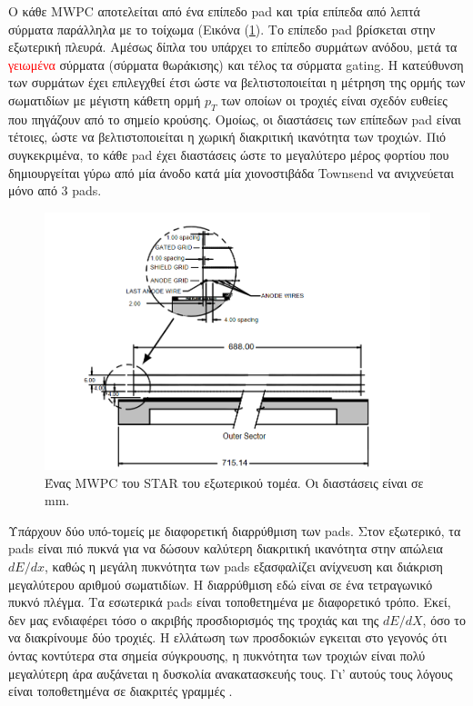	Ο κάθε MWPC αποτελείται από ένα επίπεδο pad και τρία επίπεδα από λεπτά σύρματα παράλληλα με το τοίχωμα (Εικόνα (\ref{fig3.9}). Το επίπεδο pad βρίσκεται στην εξωτερική πλευρά. Αμέσως δίπλα του υπάρχει το επίπεδο συρμάτων ανόδου, μετά τα \textcolor{red}{γειωμένα} σύρματα (σύρματα θωράκισης) και τέλος τα  σύρματα gating. Η κατεύθυνση των συρμάτων έχει επιλεγχθεί έτσι ώστε να βελτιστοποιείται η μέτρηση της ορμής των σωματιδίων με μέγιστη κάθετη ορμή $p_T$ των οποίων οι τροχιές είναι σχεδόν ευθείες που πηγάζουν από το σημείο κρούσης.
	Ομοίως, οι διαστάσεις των επίπεδων pad είναι τέτοιες, ώστε να βελτιστοποιείται η χωρική διακριτική ικανότητα των τροχιών. Πιό συγκεκριμένα, το κάθε pad έχει διαστάσεις ώστε το μεγαλύτερο μέρος φορτίου που δημιουργείται γύρω από μία άνοδο κατά μία χιονοστιβάδα Townsend να ανιχνεύεται μόνο από 3 pads. 
	
\begin{figure}[h!]
		\centering 
		\includegraphics[scale=0.3]{STAR_Detectors/Readout_Sector}
		\caption{ Ένας MWPC του STAR του εξωτερικού τομέα. Οι διαστάσεις είναι σε mm.}
		\label{fig3.9}
	\end{figure}
		
	
	Υπάρχουν δύο υπό-τομείς με διαφορετική διαρρύθμιση των pads. Στον εξωτερικό, τα pads είναι πιό πυκνά για να δώσουν καλύτερη διακριτική ικανότητα στην απώλεια $dE/dx$, καθώς η μεγάλη πυκνότητα των pads εξασφαλίζει ανίχνευση και διάκριση μεγαλύτερου αριθμού σωματιδίων. H διαρρύθμιση εδώ είναι σε ένα τετραγωνικό πυκνό  πλέγμα. 
	Τα εσωτερικά pads είναι τοποθετημένα με διαφορετικό τρόπο. Εκεί, δεν μας ενδιαφέρει τόσο ο ακριβής προσδιορισμός της τροχιάς και της $dE/dX$, όσο το να διακρίνουμε δύο τροχιές. Η ελλάτωση των προσδοκιών εγκειται στο γεγονός ότι όντας κοντύτερα στα σημεία σύγκρουσης, η πυκνότητα των τροχιών είναι πολύ μεγαλύτερη άρα αυξάνεται η δυσκολία ανακατασκευής τους. Γι' αυτούς τους λόγους είναι τοποθετημένα σε διακριτές γραμμές .
	
